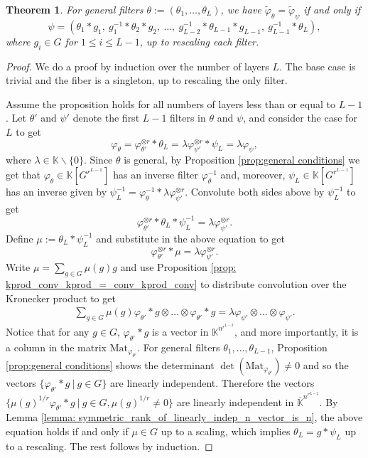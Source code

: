 \documentclass[final]{article}
\newcommand{\K}{\mathbb{K}}
\newcommand{\Mat}{\text{Mat}}
\newcommand{\conv}{\ast}
\newcommand{\kprod}{\otimes}
\theoremstyle{definition}
\theoremstyle{plain}
\newtheorem{theorem}[definition]{Theorem}
\begin{document}
\begin{theorem}\label{thm: general_fiber_of_varphi}
    For general filters $\theta:=(\theta_1, \dots, \theta_L)$, we have $\tilde\varphi_\theta =\tilde\varphi_\psi$ if and only if 
    \[
    \psi=(\theta_1 \conv g_1,\  g_1^{-1}\conv \theta_2 \conv g_2,\  \dots,\  g_{L-2}^{-1}\conv \theta_{L-1} \conv g_{L-1},\ g_{L-1}^{-1}\conv \theta_L),
    \]
    where $g_i \in G$ for $1\leq i\leq L-1$, up to rescaling each filter.
\end{theorem}
\begin{proof}
     We do a proof by induction over the number of layers $L$. The base case is trivial and the fiber is a singleton, up to rescaling the only filter.

    Assume the proposition holds for all numbers of layers less than or equal to $L-1$.
    Let $\theta'$ and $\psi'$ denote the first $L-1$ filters in $\theta$ and $\psi$, and consider the case for $L$ to get
    \[
    \varphi_\theta = \varphi_{\theta'}^{\otimes r} \conv \theta_L = \lambda \varphi_{\psi'}^{\otimes r} \conv \psi_L = \lambda \varphi_\psi,
    \]
    where $\lambda \in \K\backslash\{0\}$.
    Since $\theta$ is general, by Proposition \ref{prop:general conditions} we get that $\varphi_\theta \in \K[G^{r^{L-1}}]$ has an inverse filter $\varphi_{\theta}^{-1}$ and, moreover, $\psi_L \in \K[G^{r^{L-1}}]$ has an inverse given by $\psi_L^{-1} = \varphi_\theta^{-1}\conv \lambda \varphi_{\psi'}^{\otimes r}$.
    Convolute both sides above by $\psi_L^{-1}$ to get
    \[
    \varphi_{\theta'}^{\otimes r} \conv \theta_L\conv \psi_L^{-1} = \lambda \varphi_{\psi'}^{\otimes r}.
    \]
    Define $\mu := \theta_L \conv \psi_L^{-1}$ and substitute in the above equation to get
      \[
    \varphi_{\theta'}^{\otimes r} \conv \mu = \lambda \varphi_{\psi'}^{\otimes r}.
    \]
Write $\mu = \sum_{g\in G} \mu(g) g$ and use Proposition \ref{prop: kprod_conv_kprod_=_conv_kprod_conv} to distribute convolution over the Kronecker product to get
\begin{align*}
  \sum_{g\in G} \mu(g) \varphi_{\theta'}\conv g \kprod \dots \kprod  \varphi_{\theta'}\conv g =  \lambda \varphi_{\psi'} \kprod \dots \kprod \varphi_{\psi'}.
\end{align*}
Notice that for any $g\in G$, $\varphi_{\theta'} \conv g$ is a vector in $\K^{n^{r^{L-2}}}$, and more importantly, it is a column in the matrix $\Mat_{\varphi_{\theta'}}$.
For general filters $\theta_1, \dots, \theta_{L-1}$, Proposition \ref{prop:general conditions} shows the determinant $\det(\Mat_{\varphi_{\theta'}}) \neq 0$ and so the vectors $\{\varphi_{\theta'} \conv g\ |\ g\in G \}$ are linearly independent. 
Therefore the vectors $\{\mu(g)^{1/r}\varphi_{\theta'} \conv g\ |\ g\in G, \mu(g)^{1/r} \neq 0 \}$ are linearly independent in $\overline{\K}^{n^{r^{L-2}}}$. 
By Lemma \ref{lemma: symmetric_rank_of_linearly_indep_n_vector_is_n}, the above equation holds if and only if $\mu \in G$ up to a scaling, which implies $\theta_L = g\conv \psi_L$ up to a rescaling. 
The rest follows by induction.
\end{proof}
\end{document}
